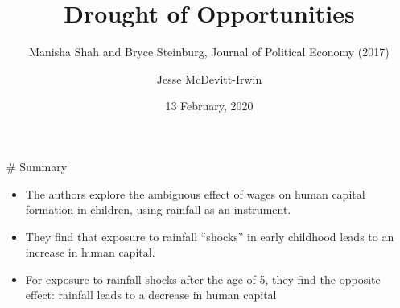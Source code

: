 \documentclass[ignorenonframetext,]{beamer}
\title{Drought of Opportunities}
\subtitle{Manisha Shah and Bryce Steinburg, Journal of Political Economy (2017)}
\author{Jesse McDevitt-Irwin}
\date{13 February, 2020}
\providecommand{\tightlist}{%
  \setlength{\itemsep}{0pt}\setlength{\parskip}{0pt}}
\begin{document}
\frame{\titlepage}

\begin{frame}{\# Summary}

\begin{itemize}[<+->]
\tightlist
\item
  The authors explore the ambiguous effect of wages on human capital
  formation in children, using rainfall as an instrument.
\item
  They find that exposure to rainfall ``shocks'' in early childhood
  leads to an increase in human capital.
\item
  For exposure to rainfall shocks after the age of 5, they find the
  opposite effect: rainfall leads to a decrease in human capital
\end{itemize}

\end{frame}
\end{document}
